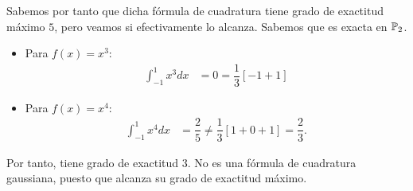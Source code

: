 \begin{ejercicio}
    Sabemos por tanto que dicha fórmula de cuadratura tiene grado de exactitud máximo $5$, pero veamos si efectivamente lo alcanza. Sabemos que es exacta en $\mathbb{P}_2$.
    \begin{itemize}
        \item Para $f(x) = x^3$:
        \begin{align*}
            \int_{-1}^{1} x^3 dx &= 0 = \dfrac{1}{3}\left[-1+1\right]
        \end{align*}
        \item Para $f(x) = x^4$:
        \begin{align*}
            \int_{-1}^{1} x^4 dx &= \dfrac{2}{5} \neq \dfrac{1}{3}\left[1+0+1\right] = \dfrac{2}{3}.
        \end{align*}
    \end{itemize}

    Por tanto, tiene grado de exactitud $3$. No es una fórmula de cuadratura gaussiana, puesto que alcanza su grado de exactitud máximo.
\end{ejercicio}

